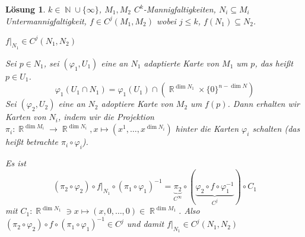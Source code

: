 \documentclass[paper=A4, twoside, chapterprefix=true, bibliography=totoc, headsepline]{scrbook}
\let\temp\phi{}
\let\phi\varphi{}
\let\varphi\temp{}
\let\temp\theta{}
\let\theta\vartheta{}
\let\vartheta\temp{}
\let\temp\epsilon{}
\let\epsilon\varepsilon{}
\let\varepsilon\temp{}
\let\temp\rho{}
\let\rho\varrho{}
\let\varrho\temp{}
\DeclareMathOperator{\N}{\mathbb{N}}
\DeclareMathOperator{\R}{\mathbb{R}}
\theoremstyle{plain}
\theoremstyle{nonumberplain}
\theoremstyle{empty}
\theoremstyle{break}
\newtheorem{Loes}{L\"osung}
\begin{document}
\begin{Loes}
$k \in \N \cup \{\infty\}$, $M_1, M_2$ $C^k$-Mannigfaltigkeiten, $N_i \subseteq M_i$ Untermannigfaltigkeit, $f \in C^j(M_1, M_2)$ wobei $j \le k$, $f(N_1) \subseteq N_2$.
\begin{description}[font=\normalfont\itshape,leftmargin=*]
\item[Behauptung:]
	$f|_{N_1} \in C^j(N_1, N_2)$
\item[Beweis:]
	Sei $p \in N_1$, sei $(\phi_1, U_1)$ eine an $N_1$ adaptierte Karte von $M_1$ um $p$, das hei\ss t $p \in U_1$.
		\[ \phi_1(U_1 \cap N_1) = \phi_1(U_1) \cap \left(\R^{\dim N_1} \times \{0\}^{n-\dim N}\right) \]
	Sei $(\phi_2, U_2)$ eine an $N_2$ adoptiere Karte von $M_2$ um $f(p)$. Dann erhalten wir Karten von $N_i$, indem wir die Projektion $\pi_i: \R^{\dim M_i} \to \R^{\dim N_i}, x \mapsto (x^1,\ldots ,x^{\dim N_i})$ hinter die Karten $\phi_i$ schalten (das hei\ss t betrachte $\pi_i \circ \phi_i$).
	
	Es ist
		\[(\pi_2 \circ \phi_2) \circ f|_{N_1} \circ (\pi_1 \circ \phi_1)^{-1} = \underbrace{\pi_2}_{C^\infty} \circ (\underbrace{\phi_2 \circ f \circ \phi_1^{-1}}_{C^j}) \circ C_1\]
	mit $C_1: \R^{\dim N_1} \ni x \mapsto (x, 0,\ldots ,0) \in \R^{\dim M_1}$. Also $(\pi_2 \circ \phi_2) \circ f \circ (\pi_1 \circ \phi_1)^{-1} \in C^j$ und damit $f|_{N_1} \in C^j(N_1, N_2)$
\end{description}
\end{Loes}
\end{document}

